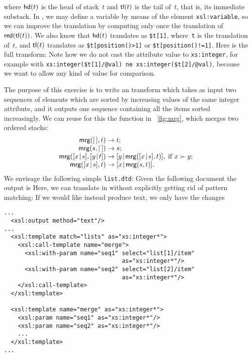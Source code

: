 where \(\textsf{hd}(t)\)  is the head of
stack~\(t\) and \(\textsf{tl}(t)\)  is the tail
of~\(t\), that is, its immediate substack. In \XSLT, we may define a
variable by means of the element \texttt{xsl:variable}, so we can
improve the translation by computing only once the translation of
\(\textsf{red}(\textsf{tl}(t))\). We also know that \(\textsf{hd}(t)\)
translates as \texttt{\$t[1]}, where~\texttt{t} is the translation
of~\(t\), and \(\textsf{tl}(t)\) translates as \texttt{\$t[position()>1]}
or \texttt{\$t[position()!=1]}. Here is the full transform:
\noindent Note how we do not cast the attribute value to
\texttt{xs:integer}, for example with
\texttt{xs:integer(\$t[1]/@val) ne xs:integer(\$t[2]/@val)}, because
we want to allow any kind of value for comparison.

\label{par:merging}

The purpose of this exercise is to write an \XSLT transform which
takes as input two sequences of elements which are sorted by
increasing values of the same integer attribute, and it outputs one
sequence containing all the items sorted increasingly. We can reuse
for this the function  in \fig~\vref{fig:mrg}, which merges
two ordered stacks:
\begin{equation*}
\begin{array}{r@{\;}l@{\;}l}
\fun{mrg}(\el,t)         & \rightarrow & t;\\
\fun{mrg}(s,\el)         & \rightarrow & s;\\
\fun{mrg}(\cons{x}{s},\cons{y}{t}) & \rightarrow
& \cons{y}{\fun{mrg}(\cons{x}{s},t)},\;\text{if \(x \succ y\)};\\
\fun{mrg}(\cons{x}{s},t) & \rightarrow & \cons{x}{\fun{mrg}(s,t)}.
\end{array}
\end{equation*}
We envisage the following simple \DTD \texttt{list.dtd}:
\noindent Given the following \XML document
\noindent the output is
Here, we can translate  in \XSLT without explicitly getting
rid of pattern matching:
\noindent If we would like instead produce text, we only have the
changes
\begin{verbatim}
...
  <xsl:output method="text"/>
...
  <xsl:template match="lists" as="xs:integer*">
    <xsl:call-template name="merge">
      <xsl:with-param name="seq1" select="list[1]/item" 
                                  as="xs:integer*"/>
      <xsl:with-param name="seq2" select="list[2]/item" 
                                  as="xs:integer*"/>
    </xsl:call-template>
  </xsl:template>

  <xsl:template name="merge" as="xs:integer*">
    <xsl:param name="seq1" as="xs:integer*"/>
    <xsl:param name="seq2" as="xs:integer*"/>
    ...
  </xsl:template>
...
\end{verbatim}


